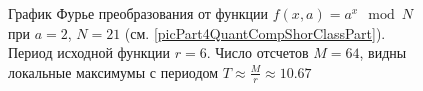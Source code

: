 \begin{figure}
\centering



\caption{График Фурье преобразования от функции 
  $f\left(x, a\right) = a^x \mod{N}$ при $a=2$, $N = 21$
  (см. \autoref{picPart4QuantCompShorClassPart}). Период исходной
  функции $r = 6$. Число отсчетов $M = 64$, видны локальные максимумы
  с периодом $T \approx \frac{M}{r} \approx 10.67$}
\label{picPart4QuantCompShorClassPartFourier}
\end{figure}
